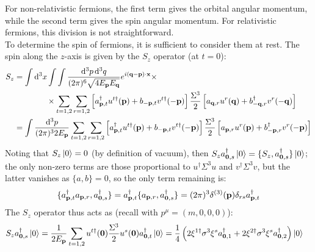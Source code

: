 For non-relativistic fermions, the first term gives the orbital angular momentum, while the second term gives the spin angular momentum. For relativistic fermions, this division is not straightforward.\\
To determine the spin of fermions, it is sufficient to consider them at rest. The spin along the $ z $-axis is given by the $ S_z $ operator (at $ t = 0 $):
\begin{equation*}
  \begin{split}
    S_z
    &= \int \mathrm{d}^3x \int \int \frac{\mathrm{d}^3p\, \mathrm{d}^3q}{(2\pi)^6 \sqrt{4 E_{\mathbf{p}} E_{\mathbf{q}}}} e^{i (\mathbf{q} - \mathbf{p}) \cdot \mathbf{x}} \times \\
    & \qquad \qquad \times \sum_{t = 1,2} \sum_{r = 1,2} \left[ a_{\mathbf{p},t}^\dagger u^{t\dagger}(\mathbf{p}) + b_{-\mathbf{p},t} v^{t\dagger}(-\mathbf{p}) \right] \frac{\Sigma^3}{2} \left[ a_{\mathbf{q},r} u^r(\mathbf{q}) + b_{-\mathbf{q},r}^\dagger v^r(-\mathbf{q}) \right] \\
    &= \int \frac{\mathrm{d}^3p}{(2\pi)^3 2E_{\mathbf{p}}} \sum_{t = 1,2} \sum_{r = 1,2} \left[ a_{\mathbf{p},t}^\dagger u^{t\dagger}(\mathbf{p}) + b_{-\mathbf{p},t} v^{t\dagger}(-\mathbf{p}) \right] \frac{\Sigma^3}{2} \left[ a_{\mathbf{p},r} u^r(\mathbf{p}) + b_{-\mathbf{p},r}^\dagger v^r(-\mathbf{p}) \right] \\
  \end{split}
\end{equation*}
Noting that $ S_z \ket{0} = 0 $ (by definition of vacuum), then $ S_z a_{\mathbf{0},s}^\dagger \ket{0} = \{S_z , a_{\mathbf{0},s}^\dagger\} \ket{0} $; the only non-zero terms are those proportional to $ u^\dagger \Sigma^3 u $ and $ v^\dagger \Sigma^3 v $, but the latter vanishes as $ \{a,b\} = 0 $, so the only term remaining is:
\begin{equation*}
  \{a_{\mathbf{p},t}^\dagger a_{\mathbf{p},r} , a_{\mathbf{0},s}^\dagger\} = a_{\mathbf{p},t}^\dagger \{a_{\mathbf{p},r} , a_{\mathbf{0},s}^\dagger\} = (2\pi)^3 \delta^{(3)}(\mathbf{p}) \delta_{rs} a_{\mathbf{p},t}^\dagger
\end{equation*}
The $ S_z $ operator thus acts as (recall  with $ p^\mu = (m,0,0,0) $):
\begin{equation*}
  \begin{split}
    S_z a_{\mathbf{0},s}^\dagger \ket{0}
    &= \frac{1}{2E_{\mathbf{p}}} \sum_{t = 1,2} u^{t\dagger}(\mathbf{0}) \frac{\Sigma^3}{2} u^s(\mathbf{0}) a_{\mathbf{0},t}^\dagger \ket{0} = \frac{1}{4} \left( 2\xi^{1\dagger} \sigma^3 \xi^s a_{\mathbf{0},1}^\dagger + 2\xi^{2\dagger} \sigma^3 \xi^s a_{\mathbf{0},2}^\dagger \right) \ket{0}
  \end{split}
\end{equation*}

